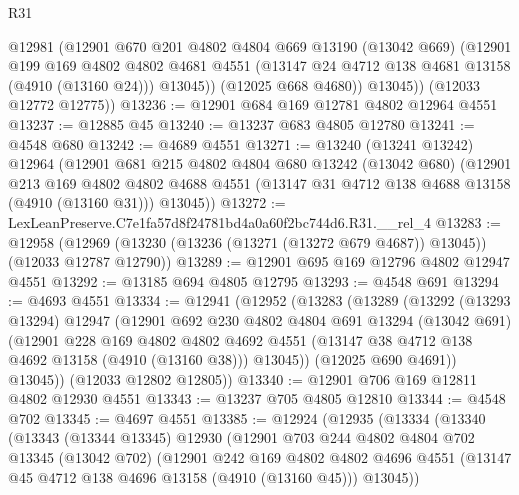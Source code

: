 \begin{lexlean}{R31}
\begin{coremodule}
            @12981
            (@12901
              @670
              @201
              @4802
              @4804
              @669
              @13190
              (@13042 @669)
              (@12901
                @199
                @169
                @4802
                @4802
                @4681
                @4551
                (@13147 @24 @4712 @138 @4681 @13158 (@4910 (@13160 @24)))
                @13045))
            (@12025 @668 @4680))
          @13045))
      (@12033 @12772 @12775))
@13236 := @12901 @684 @169 @12781 @4802 @12964 @4551
@13237 := @12885 @45
@13240 := @13237 @683 @4805 @12780
@13241 := @4548 @680
@13242 := @4689 @4551
@13271 := @13240
    (@13241 @13242)
    @12964
    (@12901
      @681
      @215
      @4802
      @4804
      @680
      @13242
      (@13042 @680)
      (@12901
        @213
        @169
        @4802
        @4802
        @4688
        @4551
        (@13147 @31 @4712 @138 @4688 @13158 (@4910 (@13160 @31)))
        @13045))
@13272 := LexLeanPreserve.C7e1fa57d8f24781bd4a0a60f2bc744d6.R31.__rel_4
@13283 := @12958
    (@12969 (@13230 (@13236 (@13271 (@13272 @679 @4687)) @13045)) (@12033 @12787 @12790))
@13289 := @12901 @695 @169 @12796 @4802 @12947 @4551
@13292 := @13185 @694 @4805 @12795
@13293 := @4548 @691
@13294 := @4693 @4551
@13334 := @12941
    (@12952
      (@13283
        (@13289
          (@13292
            (@13293 @13294)
            @12947
            (@12901
              @692
              @230
              @4802
              @4804
              @691
              @13294
              (@13042 @691)
              (@12901
                @228
                @169
                @4802
                @4802
                @4692
                @4551
                (@13147 @38 @4712 @138 @4692 @13158 (@4910 (@13160 @38)))
                @13045))
            (@12025 @690 @4691))
          @13045))
      (@12033 @12802 @12805))
@13340 := @12901 @706 @169 @12811 @4802 @12930 @4551
@13343 := @13237 @705 @4805 @12810
@13344 := @4548 @702
@13345 := @4697 @4551
@13385 := @12924
    (@12935
      (@13334
        (@13340
          (@13343
            (@13344 @13345)
            @12930
            (@12901
              @703
              @244
              @4802
              @4804
              @702
              @13345
              (@13042 @702)
              (@12901
                @242
                @169
                @4802
                @4802
                @4696
                @4551
                (@13147 @45 @4712 @138 @4696 @13158 (@4910 (@13160 @45)))
                @13045))

\end{coremodule}
\end{lexlean}
